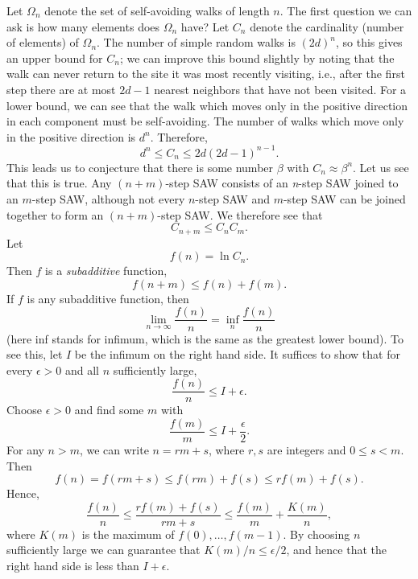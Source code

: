 \documentclass{stml-l}
\theoremstyle{definition}
\numberwithin{equation}{chapter}
\numberwithin{figure}{chapter}
\numberwithin{figure}{section}
\begin{document}
Let $\Omega_{n}$ denote the set of self-avoiding walks of length
$n$. The first question we can ask is how many elements does
$\Omega_{n}$ have? Let $C_{n}$ denote the cardinality (number of
elements) of $\Omega_{n}$. The number of simple random walks is
$(2d)^{n}$, so this gives an upper bound for $C_{n}$; we can improve
this bound slightly by noting that the walk can never return to the
site it was most recently visiting, i.e., after the first step there
are at most $2d-1$ nearest neighbors that have not been visited. For
a lower bound, we can see that the walk which moves only in the
positive direction in each component must be self-avoiding. The
number of walks which move only in the positive direction is
$d^{n}$. Therefore,
\begin{equation}
\label{ch03:eqn3.1}d^{n}\leq C_{n}\leq 2d(2d-1)^{n-1}.
\end{equation}
This leads us to conjecture that there is some number $\beta$ with
$C_{n}\approx\beta^{n}$. Let us see that this is true. Any
$(n+m)$-step SAW consists of an \emph{n}-step SAW joined to an
$m$-step SAW, although not every $n$-step SAW and $m$-step SAW can
be joined together to form an $(n+m)$-step SAW. We therefore see
that
\begin{equation*}
C_{n+m}\leq C_{n}C_{m}.
\end{equation*}
Let
\begin{equation*}
f(n)=\ln C_{n}.
\end{equation*}
Then $f$ is a \emph{subadditive} function,
\begin{equation*}
f(n+m)\leq f(n)+f(m).
\end{equation*}
If $f$ is any subadditive function, then
\begin{equation*}
\lim\limits_{n\rightarrow\infty}\frac{f(n)}{n}=\inf\limits_{n}\frac{f(n)}{n}
\end{equation*}
(here inf stands for infimum, which is the same as the greatest
lower bound). To see this, let $I$ be the infimum on the right hand
side. It suffices to show that for every $\epsilon>0$ and all $n$
sufficiently large,
\begin{equation*}
\frac{f(n)}{n}\leq I+\epsilon.
\end{equation*}
Choose $\epsilon>0$ and find some $m$ with
\begin{equation*}
\frac{f(m)}{m}\leq I+\frac{\epsilon}{2}.
\end{equation*}
For any $n>m$, we can write $n=rm+s$, where $r,s$ are integers and
$0\leq s<m$. Then
\begin{equation*}
f(n)=f(rm+s)\leq f(rm)+f(s)\leq rf(m)+f(s).
\end{equation*}
Hence,
\begin{equation*}
\frac{f(n)}{n}\leq\frac{rf(m)+f(s)}{rm+s}\leq\frac{f(m)}{m}+\frac{K(m)}{n},
\end{equation*}
where $K(m)$ is the maximum of $f(0),\ldots,f(m-1)$. By choosing
$n$ sufficiently large we can guarantee that $K(m)/n\leq\epsilon/2$,
and hence that the right hand side is less than $ I+\epsilon$.
\end{document}
